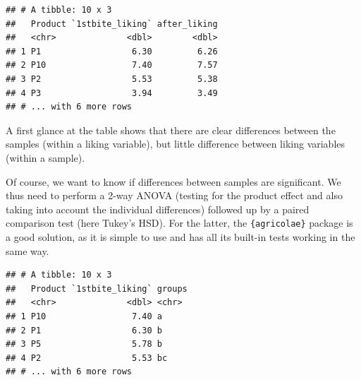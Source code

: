 \documentclass[
]{krantz}
\makeatletter
\newenvironment{Shaded}{\begin{snugshade}}{\end{snugshade}}
\newcommand{\AttributeTok}[1]{\textcolor[rgb]{0.61,0.61,0.61}{#1}}
\newcommand{\FunctionTok}[1]{\textcolor[rgb]{0,0,0}{#1}}
\newcommand{\NormalTok}[1]{#1}
\newcommand{\OtherTok}[1]{\textcolor[rgb]{0.37,0.37,0.37}{#1}}
\newcommand{\SpecialCharTok}[1]{\textcolor[rgb]{0,0,0}{#1}}
\newcommand{\StringTok}[1]{\textcolor[rgb]{0.5,0.5,0.5}{#1}}
\newenvironment{kframe}{%
\medskip{}
\setlength{\fboxsep}{.8em}
 \def\at@end@of@kframe{}%
 \ifinner\ifhmode%
  \def\at@end@of@kframe{\end{minipage}}%
  \begin{minipage}{\columnwidth}%
 \fi\fi%
 \def\FrameCommand##1{\hskip\@totalleftmargin \hskip-\fboxsep
 \colorbox{shadecolor}{##1}\hskip-\fboxsep
     \hskip-\linewidth \hskip-\@totalleftmargin \hskip\columnwidth}%
 \MakeFramed {\advance\hsize-\width
   \@totalleftmargin\z@ \linewidth\hsize
   \@setminipage}}%
 {\par\unskip\endMakeFramed%
 \at@end@of@kframe}
\renewenvironment{Shaded}{\begin{kframe}}{\end{kframe}}
\makeatother
\begin{document}
\begin{verbatim}
## # A tibble: 10 x 3
##   Product `1stbite_liking` after_liking
##   <chr>              <dbl>        <dbl>
## 1 P1                  6.30         6.26
## 2 P10                 7.40         7.57
## 3 P2                  5.53         5.38
## 4 P3                  3.94         3.49
## # ... with 6 more rows
\end{verbatim}

A first glance at the table shows that there are clear differences between the samples (within a liking variable), but little difference between liking variables (within a sample).

Of course, we want to know if differences between samples are significant. We thus need to perform a 2-way ANOVA (testing for the product effect and also taking into account the individual differences) followed up by a paired comparison test (here Tukey's HSD). For the latter, the \texttt{\{agricolae\}} package is a good solution, as it is simple to use and has all its built-in tests working in the same way.

\begin{Shaded}
\end{Shaded}

\begin{verbatim}
## # A tibble: 10 x 3
##   Product `1stbite_liking` groups
##   <chr>              <dbl> <chr> 
## 1 P10                 7.40 a     
## 2 P1                  6.30 b     
## 3 P5                  5.78 b     
## 4 P2                  5.53 bc    
## # ... with 6 more rows
\end{verbatim}
\end{document}

